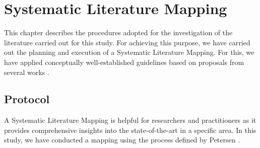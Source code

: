 \chapter{Systematic Literature Mapping}
\label{chap:slm}


This chapter describes the procedures adopted for the investigation of the literature carried out for this study.
For achieving this purpose, we have carried out the planning and execution of a Systematic Literature Mapping.
For this, we have applied conceptually well-established guidelines based on proposals from several works \cite{Kitchenham:2007, Petersen:2008, Nakagawa:2017}.




\section{Protocol}\label{sec:slr_protocol}


A Systematic Literature Mapping is helpful for researchers and practitioners as it provides comprehensive insights into the state-of-the-art in a specific area.
In this study, we have conducted a mapping using the process defined by Petersen \cite{Petersen:2008}.

